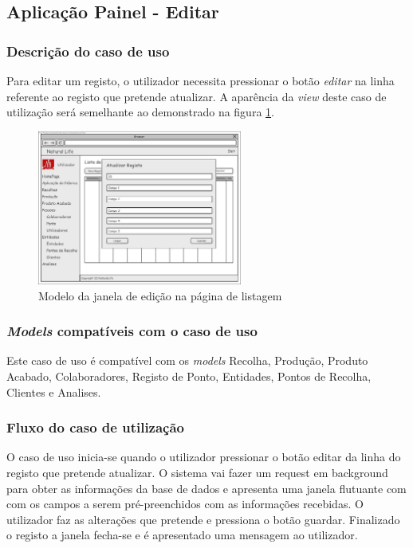 \subsection{Aplicação Painel - Editar}
\subsubsection*{Descrição do caso de uso}
Para editar um registo, o utilizador necessita pressionar o botão \textit{editar} na linha referente ao registo que pretende atualizar. A aparência da \textit{view} deste caso de utilização será semelhante ao demonstrado na figura \ref{fig:di_editar}. 

\begin{figure}[H] 
	\begin{center}
		\includegraphics[width=0.60\textwidth,keepaspectratio]{figuras/Diagramas_vp/DI_Painel_3_Editar.jpg}
		\caption{Modelo da janela de edição na página de listagem}
		\label{fig:di_editar} 
	\end{center}
\end{figure}

\subsubsection*{\textit{Models} compatíveis com o caso de uso}
Este caso de uso é compatível com os \textit{models} Recolha, Produção, Produto Acabado, Colaboradores, Registo de Ponto, Entidades, Pontos de Recolha, Clientes e Analises.

\subsubsection*{Fluxo do caso de utilização}
O caso de uso inicia-se quando o utilizador pressionar o botão editar da linha do registo que pretende atualizar. O sistema vai fazer um request em background para obter as informações da base de dados e apresenta uma janela flutuante com com os campos a serem pré-preenchidos com as informações recebidas. O utilizador faz as alterações que pretende e pressiona o botão guardar. Finalizado o registo a janela fecha-se e é apresentado uma mensagem ao utilizador.


